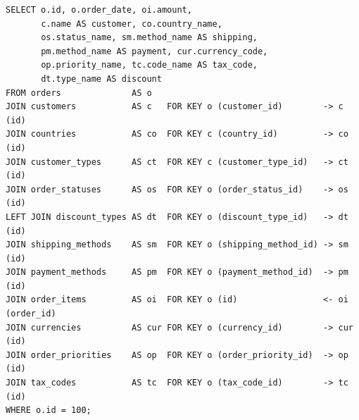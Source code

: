 \documentclass[12pt]{article}
\newcommand{\FanoutCheckHeight}[3]{%
  \ifdim\dimexpr\ht#1+\dp#1\relax>#2\relax
    \PackageError{fanout-layout}{#3 exceeds its vertical allocation}%
      {Adjust the terminal line spacing or the box position.}%
  \fi
}
\begin{document}
\newsavebox{\canonicalStageFive}
\begin{lrbox}{\canonicalStageFive}\begin{minipage}{344mm}
\begin{NoHyper}
\begin{lstlisting}[style=complex-sql]
SELECT o.id, o.order_date, oi.amount,
       c.name AS customer, co.country_name,
       os.status_name, sm.method_name AS shipping,
       pm.method_name AS payment, cur.currency_code,
       op.priority_name, tc.code_name AS tax_code,
       dt.type_name AS discount
FROM orders              AS o
JOIN customers           AS c   FOR KEY o (customer_id)        -> c (id)
JOIN countries           AS co  FOR KEY c (country_id)         -> co (id)
JOIN customer_types      AS ct  FOR KEY c (customer_type_id)   -> ct (id)
JOIN order_statuses      AS os  FOR KEY o (order_status_id)    -> os (id)
LEFT JOIN discount_types AS dt  FOR KEY o (discount_type_id)   -> dt (id)
JOIN shipping_methods    AS sm  FOR KEY o (shipping_method_id) -> sm (id)
JOIN payment_methods     AS pm  FOR KEY o (payment_method_id)  -> pm (id)
JOIN order_items         AS oi  FOR KEY o (id)                 <- oi (order_id)
JOIN currencies          AS cur FOR KEY o (currency_id)        -> cur (id)
JOIN order_priorities    AS op  FOR KEY o (order_priority_id)  -> op (id)
JOIN tax_codes           AS tc  FOR KEY o (tax_code_id)        -> tc (id)
WHERE o.id = 100;
\end{lstlisting}
\end{NoHyper}
\end{minipage}\end{lrbox}
\FanoutCheckHeight{\canonicalStageFive}{122mm}{Canonical-form state 5}
\end{document}
